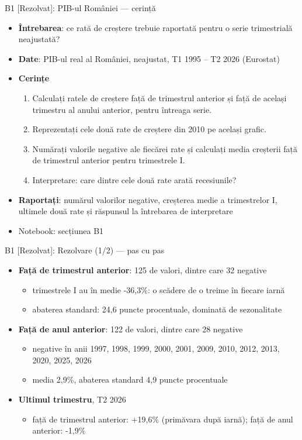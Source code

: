 \begin{frame}{B1 [Rezolvat]: PIB-ul României --- cerință}
\itemsize{\footnotesize}
\begin{itemize}
\item \textbf{Întrebarea}: ce rată de creștere trebuie raportată pentru o serie trimestrială neajustată?
\item \textbf{Date}: PIB-ul real al României, neajustat, T1 1995 -- T2 2026 (Eurostat)
\item \textbf{Cerințe}
\begin{enumerate}
    \item Calculați ratele de creștere față de trimestrul anterior și față de același trimestru al anului anterior, pentru întreaga serie.
    \item Reprezentați cele două rate de creștere din 2010 pe același grafic.
    \item Numărați valorile negative ale fiecărei rate și calculați media creșterii față de trimestrul anterior pentru trimestrele I.
    \item Interpretare: care dintre cele două rate arată recesiunile?
\end{enumerate}
\item \textbf{Raportați}: numărul valorilor negative, creșterea medie a trimestrelor I, ultimele două rate și răspunsul la întrebarea de interpretare
\item Notebook: secțiunea B1
\end{itemize}
\end{frame}

\begin{frame}{B1 [Rezolvat]: Rezolvare (1/2) --- pas cu pas}
\itemsize{\footnotesize}
\begin{itemize}
    \item \textbf{Față de trimestrul anterior}: 125 de valori, dintre care 32 negative
    \begin{itemize}
        \item trimestrele I au în medie -36{,}3\%: o scădere de o treime în fiecare iarnă
        \item abaterea standard: 24{,}6 puncte procentuale, dominată de sezonalitate
    \end{itemize}
    \item \textbf{Față de anul anterior}: 122 de valori, dintre care 28 negative
    \begin{itemize}
        \item negative în anii 1997, 1998, 1999, 2000, 2001, 2009, 2010, 2012, 2013, 2020, 2025, 2026
        \item media 2{,}9\%, abaterea standard 4{,}9 puncte procentuale
    \end{itemize}
    \item \textbf{Ultimul trimestru}, T2 2026
    \begin{itemize}
        \item față de trimestrul anterior: $+$19{,}6\% (primăvara după iarnă); față de anul anterior: -1{,}9\%
    \end{itemize}
\end{itemize}
\end{frame}


